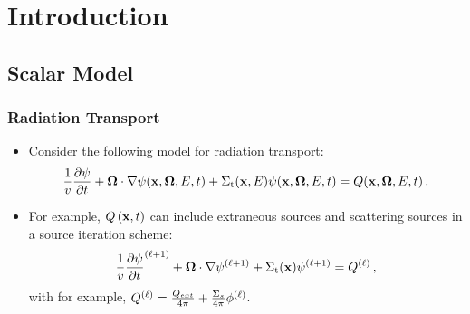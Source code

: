\section{Introduction}
\subsection{Scalar Model}
\begin{frame}
\frametitle{Radiation Transport}

\begin{itemize}
  \item Consider the following model for radiation transport:
    \begin{equation}\label{eq:rad_transport}
      \frac{1}{v}\frac{\partial \psi}{\partial t}
        + \mathbf{\Omega}\cdot\nabla\psi(\mathbf{x},\mathbf{\Omega},E,t)
        + \Sigma_\text{t}(\mathbf{x},E)\psi(\mathbf{x},\mathbf{\Omega},E,t)
        = Q(\mathbf{x},\mathbf{\Omega},E,t) \,.
    \end{equation}
  \item For example, $Q\left(\mathbf{x},t\right)$ can include extraneous sources
    and scattering sources in a source iteration scheme:
    \begin{equation}
      \frac{1}{v}\frac{\partial \psi}{\partial t}^{(\ell+1)}
        + \mathbf{\Omega}\cdot\nabla\psi^{(\ell+1)}
        + \Sigma_\text{t}(\mathbf{x})\psi^{(\ell+1)}
        = Q^{(\ell)} \,,
    \end{equation}
    with for example, $Q^{(\ell)}=
    \frac{Q_{ext}}{4\pi} + \frac{\Sigma_s}{4\pi}\phi^{(\ell)}$.
\end{itemize}

\end{frame}

